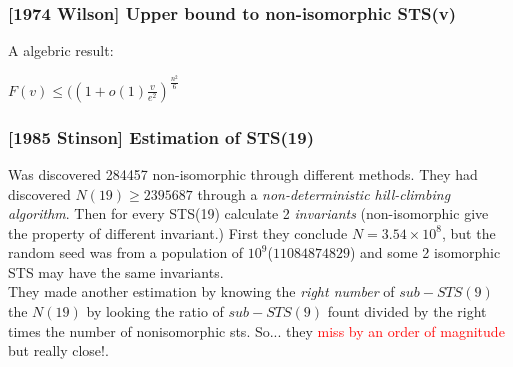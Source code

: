 \begin{frame}
\frametitle{[1974 Wilson] Upper bound to non-isomorphic STS(v)}
A algebric result:
\begin{center}
	\begin{math}
		F(v) \le ((1 + o (1)\frac{v}{e^2})^{\frac{n^2}{6}}
 	\end{math}
\end{center}
\end{frame}


\begin{frame}
\frametitle{[1985 Stinson] Estimation of STS(19)}
Was discovered 284457 non-isomorphic through different methods.
They had discovered $N(19) \ge 2395687$  through a \textit{non-deterministic hill-climbing algorithm}. Then for every STS(19) calculate 2 \textit{invariants} (non-isomorphic give the property of different invariant.) First they conclude $N=3.54 \times 10^8$, but the random seed was from a population of $10^9$($11084874829$) and some 2 isomorphic STS may have the same invariants.\\

They made another estimation by knowing the \textit{right number} of $sub-STS(9)$ the $N(19)$ by looking the ratio of $sub-STS(9)$ fount divided by the right times the number of nonisomorphic sts. So... they \textcolor{red}{miss by an order of magnitude} but really close!.
\end{frame}
